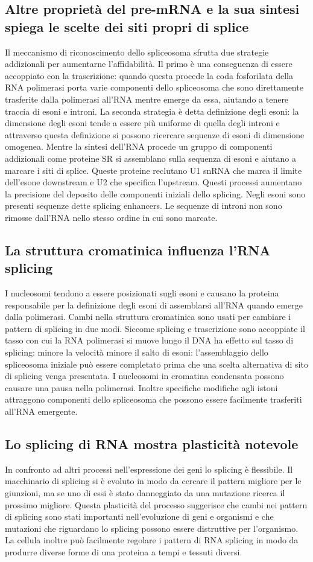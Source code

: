 \subsection{Altre propriet\`a del pre-mRNA e la sua sintesi spiega le scelte dei siti propri di splice}
Il meccanismo di riconoscimento dello spliceosoma sfrutta due strategie addizionali per aumentarne l'affidabilit\`a. Il primo \`e una conseguenza di essere accoppiato con la 
trascrizione: quando questa procede la coda fosforilata della RNA polimerasi porta varie componenti dello spliceosoma che sono direttamente trasferite dalla polimerasi all'RNA mentre 
emerge da essa, aiutando a tenere traccia di esoni e introni. La seconda strategia \`e detta definizione degli esoni: la dimensione degli esoni tende a essere pi\`u uniforme di quella
degli introni e attraverso questa definizione si possono ricercare sequenze di esoni di dimensione omogenea. Mentre la sintesi dell'RNA procede un gruppo di componenti addizionali come 
proteine SR si assemblano sulla sequenza di esoni e aiutano a marcare i siti di splice. Queste proteine reclutano U1 snRNA che marca il limite dell'esone downstream e U2 che specifica
l'upstream. Questi processi aumentano la precisione del deposito delle componenti iniziali dello splicing. Negli esoni sono presenti sequenze dette splicing enhancers. Le sequenze di
introni non sono rimosse dall'RNA nello stesso ordine in cui sono marcate. 
\subsection{La struttura cromatinica influenza l'RNA splicing}
I nucleosomi tendono a essere posizionati sugli esoni e causano la proteina responsabile per la definizione degli esoni di assemblarsi all'RNA quando emerge dalla polimerasi. Cambi 
nella struttura cromatinica sono usati per cambiare i pattern di splicing in due modi. Siccome splicing e trascrizione sono accoppiate il tasso con cui la RNA polimerasi si muove 
lungo il DNA ha effetto sul tasso di splicing: minore la velocit\`a minore il salto di esoni: l'assemblaggio dello spliceosoma iniziale pu\`o essere completato prima che una scelta 
alternativa di sito di splicing venga presentata. I nucleosomi in cromatina condensata possono causare una pausa nella polimerasi. Inoltre specifiche modifiche agli istoni attraggono 
componenti dello spliceosoma che possono essere facilmente trasferiti all'RNA emergente. 
\subsection{Lo splicing di RNA mostra plasticit\`a notevole}
In confronto ad altri processi nell'espressione dei geni lo splicing \`e flessibile. Il macchinario di splicing si \`e evoluto in modo da cercare il pattern migliore per le giunzioni, ma
se uno di essi \`e stato danneggiato da una mutazione ricerca il prossimo migliore. Questa plasticit\`a del processo suggerisce che cambi nei pattern di splicing sono stati importanti
nell'evoluzione di geni e organismi e che mutazioni che riguardano lo splicing possono essere distruttive per l'organismo. La cellula inoltre pu\`o facilmente regolare i pattern di RNA
splicing in modo da produrre diverse forme di una proteina a tempi e tessuti diversi. 
